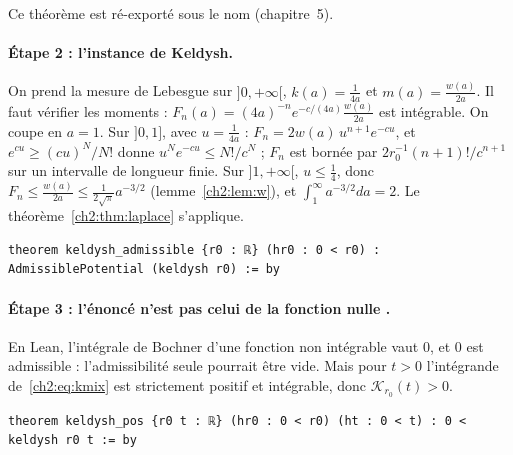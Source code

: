 Ce théorème est ré-exporté sous le nom  (chapitre~5).

\paragraph{Étape 2 : l'instance de Keldysh.} On prend la mesure de Lebesgue sur $]0,+\infty[$, $k(a)=\frac1{4a}$ et
$m(a)=\frac{w(a)}{2a}$. Il faut vérifier les moments : $F_n(a)=(4a)^{-n}e^{-c/(4a)}\frac{w(a)}{2a}$ est intégrable.
On coupe en $a=1$. Sur $]0,1]$, avec $u=\frac1{4a}$ : $F_n=2w(a)\,u^{n+1}e^{-cu}$, et $e^{cu}\ge(cu)^N/N!$ donne
$u^Ne^{-cu}\le N!/c^N$ ; $F_n$ est bornée par $2r_0^{-1}(n+1)!/c^{n+1}$ sur un intervalle de longueur finie. Sur
$]1,+\infty[$, $u\le\frac14$, donc $F_n\le\frac{w(a)}{2a}\le\frac1{2\sqrt\pi}a^{-3/2}$ (lemme~\ref{ch2:lem:w}), et
$\int_1^\infty a^{-3/2}da=2$. Le théorème~\ref{ch2:thm:laplace} s'applique.
\begin{leanbox}
\begin{lstlisting}[style=chdeux]
theorem keldysh_admissible {r0 : ℝ} (hr0 : 0 < r0) : AdmissiblePotential (keldysh r0) := by
\end{lstlisting}
\end{leanbox}

\paragraph{Étape 3 : l'énoncé n'est pas celui de la fonction nulle \tierA.} En Lean, l'intégrale de Bochner d'une
fonction non intégrable vaut $0$, et $0$ est admissible : l'admissibilité seule pourrait être vide. Mais pour $t>0$
l'intégrande de~\eqref{ch2:eq:kmix} est strictement positif et intégrable, donc $\mathcal K_{r_0}(t)>0$.
\begin{leanbox}
\begin{lstlisting}[style=chdeux]
theorem keldysh_pos {r0 t : ℝ} (hr0 : 0 < r0) (ht : 0 < t) : 0 < keldysh r0 t := by
\end{lstlisting}
\end{leanbox}

